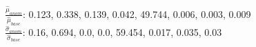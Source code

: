 $\frac{\hat\mu_{anom}}{\hat\mu_{base}}$: 0.123, 0.338, 0.139, 0.042, 49.744, 0.006, 0.003, 0.009\\$\frac{\hat\sigma_{anom}}{\hat\sigma_{base}}$: 0.16, 0.694, 0.0, 0.0, 59.454, 0.017, 0.035, 0.03